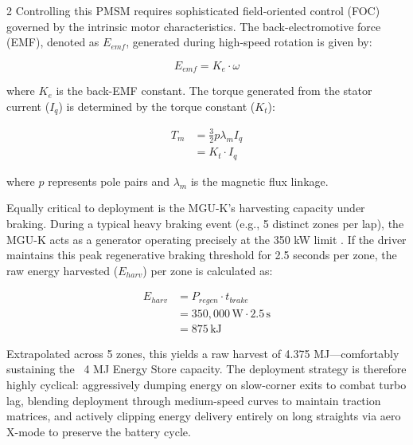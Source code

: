 \begin{multicols}{2}
Controlling this PMSM requires sophisticated field-oriented control (FOC) governed by the intrinsic motor characteristics. The back-electromotive force (EMF), denoted as $E_{emf}$, generated during high-speed rotation is given by:

\begin{equation} \label{eq:back_emf}
E_{emf} = K_e \cdot \omega
\end{equation}

where $K_e$ is the back-EMF constant. The torque generated from the stator current ($I_{q}$) is determined by the torque constant ($K_t$):

\begin{equation} \label{eq:torque_constant}
\begin{split}
T_m &= \frac{3}{2} p \lambda_m I_q \\
&= K_t \cdot I_q
\end{split}
\end{equation}

where $p$ represents pole pairs and $\lambda_m$ is the magnetic flux linkage.

Equally critical to deployment is the MGU-K's harvesting capacity under braking. During a typical heavy braking event (e.g., 5 distinct zones per lap), the MGU-K acts as a generator operating precisely at the 350 kW limit \cite{FIA_2026_PU_Regulations}. If the driver maintains this peak regenerative braking threshold for 2.5 seconds per zone, the raw energy harvested ($E_{harv}$) per zone is calculated as:

\begin{equation} \label{eq:harvest}
\begin{split}
E_{harv} &= P_{regen} \cdot t_{brake} \\
&= 350,000\,\mathrm{W} \cdot 2.5\,\mathrm{s} \\
&= 875\,\mathrm{kJ}
\end{split}
\end{equation}

Extrapolated across 5 zones, this yields a raw harvest of 4.375 MJ—comfortably sustaining the ~4 MJ Energy Store capacity. The deployment strategy is therefore highly cyclical: aggressively dumping energy on slow-corner exits to combat turbo lag, blending deployment through medium-speed curves to maintain traction matrices, and actively clipping energy delivery entirely on long straights via aero X-mode to preserve the battery cycle.
\end{multicols}

